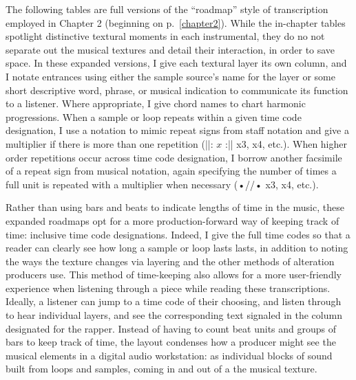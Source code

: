 \onehalfspacing
\appendix \label{appendix:fullroadmaps}
\renewcommand{\thetable}{A.\arabic{table}}
\setcounter{table}{0}

The following tables are full versions of the ``roadmap'' style of transcription employed in Chapter 2 (beginning on p.~\ref{chapter2}). While the in-chapter tables spotlight distinctive textural moments in each instrumental, they do no not separate out the musical textures and detail their interaction, in order to save space. In these expanded versions, I give each textural layer its own column, and I notate entrances using either the sample source's name for the layer or some short descriptive word, phrase, or musical indication to communicate its function to a listener. Where appropriate, I give chord names to chart harmonic progressions. When a sample or loop repeats within a given time code designation, I use a notation to mimic repeat signs from staff notation and give a multiplier if there is more than one repetition (||: $x$ :|| x3, x4, etc.). When higher order repetitions occur across time code designation, I borrow another facsimile of a repeat sign from musical notation, again specifying the number of times a full unit is repeated with a multiplier when necessary (•//• x3, x4, etc.).

Rather than using bars and beats to indicate lengths of time in the music, these expanded roadmaps opt for a more production-forward way of keeping track of time: inclusive time code designations. Indeed, I give the full time codes so that a reader can clearly see how long a sample or loop lasts lasts, in addition to noting the ways the texture changes via layering and the other methods of alteration producers use. This method of time-keeping also allows for a more user-friendly experience when listening through a piece while reading these transcriptions. Ideally, a listener can jump to a time code of their choosing, and listen through to hear individual layers, and see the corresponding text signaled in the column designated for the rapper. Instead of having to count beat units and groups of bars to keep track of time, the layout condenses how a producer might see the musical elements in a digital audio workstation: as individual blocks of sound built from loops and samples, coming in and out of a the musical texture.

